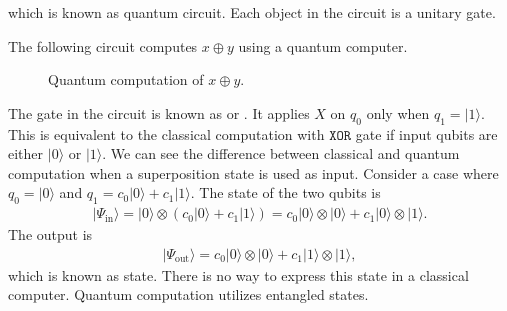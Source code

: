 \documentclass[letterpaper,10pt,english]{jupyterBook}
\begin{document}
\sphinxAtStartPar
which is known as quantum circuit.  Each object in the circuit is a unitary gate.

\sphinxAtStartPar
The following circuit computes \(x \oplus y\) using a quantum computer.

\begin{figure}[htbp]
\centering
\capstart

\noindent{}
\caption{Quantum computation of \(x \oplus y\).}\label{\detokenize{computation/qcomp:quantum-x-y}}\end{figure}

\sphinxAtStartPar
The gate in the circuit is known as  or .  It applies \(X\) on \(q_0\) only when \(q_1 = \lvert 1 \rangle\). This is equivalent to the classical computation with \(\texttt{XOR}\) gate if input qubits are either \(\lvert 0 \rangle\) or \(\lvert 1 \rangle\).   We can see the difference between classical and quantum computation  when a superposition state is used as input. Consider a case where \(q_0=\lvert 0 \rangle\) and \(q_1=c_0 |0 \rangle + c_1 \lvert 1 \rangle\).  The state of the two qubits is
\begin{equation*}
\begin{split}
\lvert \Psi_\text{in} \rangle = \lvert 0 \rangle \otimes (c_0 \lvert 0 \rangle + c_1 \lvert 1 \rangle) = c_0 \lvert 0 \rangle\otimes \lvert 0 \rangle + c_1 \lvert 0 \rangle \otimes \lvert 1 \rangle.
\end{split}
\end{equation*}
\sphinxAtStartPar
The output is
\begin{equation*}
\begin{split}
\lvert \Psi_\text{out} \rangle =  c_0 \lvert 0 \rangle \otimes \lvert 0 \rangle + c_1 \lvert 1 \rangle \otimes \lvert 1 \rangle,
\end{split}
\end{equation*}
\sphinxAtStartPar
which is known as   state.   There is no way to express this state in a classical computer.  Quantum computation utilizes entangled states.
\end{document}
